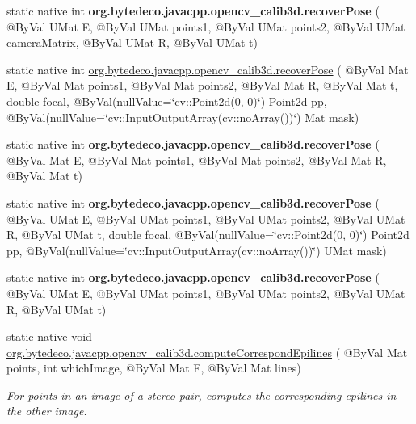 \begin{DoxyCompactItemize}
static native int {\bfseries org.\+bytedeco.\+javacpp.\+opencv\+\_\+calib3d.\+recover\+Pose} ( @By\+Val U\+Mat E, @By\+Val U\+Mat points1, @By\+Val U\+Mat points2, @By\+Val U\+Mat camera\+Matrix, @By\+Val U\+Mat R, @By\+Val U\+Mat t)
\item 
static native int \hyperlink{group__calib3d_gaf6412b75e2ce96f4461d17a09c09c8b9}{org.\+bytedeco.\+javacpp.\+opencv\+\_\+calib3d.\+recover\+Pose} ( @By\+Val Mat E, @By\+Val Mat points1, @By\+Val Mat points2, @By\+Val Mat R, @By\+Val Mat t, double focal, @By\+Val(null\+Value=\char`\"{}cv\+::\+Point2d(0, 0)\char`\"{}) Point2d pp, @By\+Val(null\+Value=\char`\"{}cv\+::\+Input\+Output\+Array(cv\+::no\+Array())\char`\"{}) Mat mask)
\item 
\mbox{\label{group__calib3d_ga169e641416a67b5f6017be9234bfc93b}} 
static native int {\bfseries org.\+bytedeco.\+javacpp.\+opencv\+\_\+calib3d.\+recover\+Pose} ( @By\+Val Mat E, @By\+Val Mat points1, @By\+Val Mat points2, @By\+Val Mat R, @By\+Val Mat t)
\item 
\mbox{\label{group__calib3d_gac4b6e24a58518ff37797c103d7d21fae}} 
static native int {\bfseries org.\+bytedeco.\+javacpp.\+opencv\+\_\+calib3d.\+recover\+Pose} ( @By\+Val U\+Mat E, @By\+Val U\+Mat points1, @By\+Val U\+Mat points2, @By\+Val U\+Mat R, @By\+Val U\+Mat t, double focal, @By\+Val(null\+Value=\char`\"{}cv\+::\+Point2d(0, 0)\char`\"{}) Point2d pp, @By\+Val(null\+Value=\char`\"{}cv\+::\+Input\+Output\+Array(cv\+::no\+Array())\char`\"{}) U\+Mat mask)
\item 
\mbox{\label{group__calib3d_ga4a7d566ed56aff64092dc14997ccb10d}} 
static native int {\bfseries org.\+bytedeco.\+javacpp.\+opencv\+\_\+calib3d.\+recover\+Pose} ( @By\+Val U\+Mat E, @By\+Val U\+Mat points1, @By\+Val U\+Mat points2, @By\+Val U\+Mat R, @By\+Val U\+Mat t)
\item 
static native void \hyperlink{group__calib3d_ga7bf6bd2c5ee1b9d403fb85aa5dec095f}{org.\+bytedeco.\+javacpp.\+opencv\+\_\+calib3d.\+compute\+Correspond\+Epilines} ( @By\+Val Mat points, int which\+Image, @By\+Val Mat F, @By\+Val Mat lines)
\begin{DoxyCompactList}\small\item\em For points in an image of a stereo pair, computes the corresponding epilines in the other image. \end{DoxyCompactList}\item 

\end{DoxyCompactItemize}
